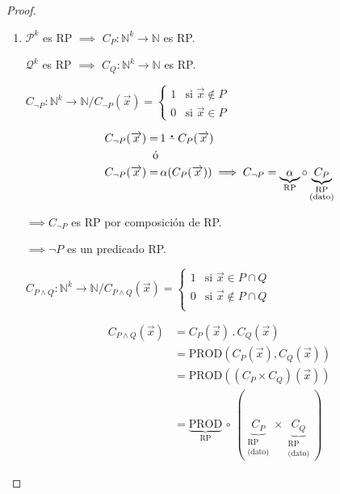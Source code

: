\begin{proof} \phantom{.}
    \begin{enumerate}
        \item $\mathcal{P}^k$ es RP $\implies$ 
            $C_{{P}}: \mathbb{N}^k \to \mathbb{N}$ es RP.

            $\mathcal{Q}^k$ es RP $\implies$ 
            $C_{Q}: \mathbb{N}^k \to \mathbb{N}$ es RP.

            $C_{\neg P}: \mathbb{N}^k \to \mathbb{N} /
            C_{\neg P} (\overrightarrow{x}) = 
            \begin{cases}
                1 & \text{si } \overrightarrow{x} \notin {P} \\
                0 & \text{si } \overrightarrow{x} \in {P}
            \end{cases}$

            \begin{align*}
                C_{\neg P} (\overrightarrow{x}) =& \, 
                1 \;\accentset{\mbox{\large\bfseries .}}{\text{--}}\; C_{P}(\overrightarrow{x})\\
                \text{ó}& \\
                C_{\neg P} (\overrightarrow{x}) =& \,
                \alpha(C_{P}(\overrightarrow{x})) \implies C_{\neg P} 
                = \underbrace{\alpha}_{\text{RP}} \circ 
            \underbrace{C_P}_{\substack{\text{RP}\\ \text{(dato)}}}
            \end{align*}

            $\implies C_{\neg P}$ es RP por composición de RP.

            $\implies \neg P$ es un predicado RP.


            $C_{P \wedge Q}: \mathbb{N}^k \to \mathbb{N} /
            C_{P \wedge Q} (\overrightarrow{x}) = 
            \begin{cases}
                1 & \text{si } \overrightarrow{x} \in 
                P \cap Q \\
                0 & \text{si } \overrightarrow{x} \notin
                P \cap Q \\
            \end{cases}$

            \begin{align*}
                C_{P \wedge Q}(\overrightarrow{x}) &= 
                C_{{P}}(\overrightarrow{x}) \, . \,
                C_{{Q}}(\overrightarrow{x}) \\
                &= \mathrm{PROD}(C_{{P}}(\overrightarrow{x}), 
                    C_{{Q}}(\overrightarrow{x})) \\
                &= \mathrm{PROD}( (C_{{P}}  \times
                    C_{{Q}}) (\overrightarrow{x})) \\
                &= \underbrace{\mathrm{PROD}}_{\text{RP}} 
                \, \circ \,
                (\underbrace{C_{{P}}}_{\substack{\text{RP}\\
                \text{(dato)}}} \times 
                    \underbrace{C_{{Q}}}_{\substack{\text{RP}\\
                    \text{(dato)}}})
            \end{align*}


\end{enumerate}
\end{proof}
